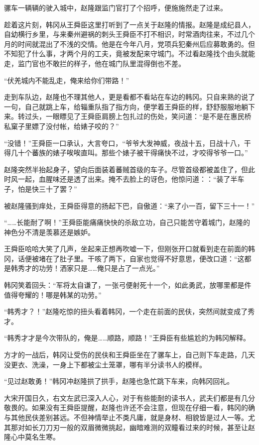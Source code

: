 骡车一辆辆的驶入城中，赵隆跟监门官打了个招呼，便施施然走了过来。

趁着这片刻，韩冈从王舜臣这里打听到了一点关于赵隆的情报。赵隆是成纪县人，自幼横行乡里，与来秦州避祸的刺头王舜臣不打不相识，时常酒肉往来，不过几个月的时间就混出了不浅的交情。他是在今年八月，党项兵犯秦州后应募敢勇的。但不知犯了什么事，才两个月的工夫，竟被发配来守城门。不过看赵隆找个由头就能走，监门官也不敢拦的样子，他在城门队里混得倒也不差。

“伏羌城内不能乱走，俺来给你们带路！”

走到车队边，赵隆也不理其他人，更是看都不看站在车边的韩冈。只自来熟的说了一句，自己就跳上车，给辎重队指了指方向，便学着王舜臣的样，舒舒服服地躺下来。转过头，一眼瞟见了王舜臣肩膀上包扎过的伤处，笑问道：“是不是在惠民桥私窠子里嫖了没付帐，给婊子咬的？”

“没错！”王舜臣一口承认，大言夸口，“爷爷大发神威，夜战十五，日战十八，干得几十个蕃族的婊子唉唉直叫。那些个婊子被干得痛快不过，才咬得爷爷一口。”

赵隆突然半抬起身子，望向后面装着蕃贼首级的车子。尽管首级都被盖住了，但此时风一起，血腥味还是透了出来。掩不去脸上的讶色，他惊问道：：“装了半车子，怕是快三十了罢？”

被赵隆骚到痒处，王舜臣得意的扬起下巴，自傲道：“来了小一百，留下三十一！”

“……长能耐了啊！”王舜臣能痛痛快快的杀敌立功，自己只能苦守着城门，赵隆的神色分不清是羡慕还是嫉妒。

王舜臣哈哈大笑了几声，坐起来正想再吹嘘一下，但刚张开口就看到走在前面的韩冈，话便被堵在了肚子里。干咳了两下，自家也觉得不好意思，便改口道：“这都是韩秀才的功劳！洒家只是……俺只是占了一点光。”

韩冈笑着回头：“军将太自谦了，一张弓便射死十一个，如此勇武，放哪里都是件值得夸耀的！哪是韩某的功劳。”

“韩秀才？！”赵隆吃惊的扭头看着韩冈，一个走在前面的民伕，突然间就变成了秀才。

“韩秀才才是今次带队的，俺是……顺路，顺路！”王舜臣有些尴尬的为韩冈解释。

方才的一战后，韩冈让受伤的民伕和王舜臣坐在了骡车上，自己则下车走路，几天没更衣、洗澡，一身上下都被尘土笼罩，哪有半分读书人的模样。

“见过赵敢勇！”韩冈冲赵隆拱了拱手，赵隆也急忙跳下车来，向韩冈回礼。

大宋开国日久，右文左武已深入人心，对于有些能耐的读书人，武夫们都是有几分敬畏的。如果没有王舜臣提醒，赵隆也许还不会注意，但现在仔细一看，韩冈的确与其他民伕差别甚远。不但神情举止不类凡庸，就是身材、相貌皆是过人一等。尤其那对如长刀刀刃一般的双眉微微挑起，幽暗难测的双瞳看过来的时候，甚至让赵隆心中莫名生寒。

